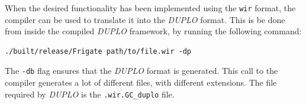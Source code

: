 \documentclass[twoside,11pt,openright]{report}
\newcommand{\DUPLO}{\textit{DUPLO} }
\begin{document}
\bigskip

When the desired functionality has been implemented using the \verb|wir| format, the compiler can be used to translate it into the \DUPLO format. This is be done from inside the compiled \DUPLO framework, by running the following command:

\begin{center}
\begin{verbatim}
./built/release/Frigate path/to/file.wir -dp
\end{verbatim}
\end{center}

The \verb|-db| flag ensures that the \DUPLO format is generated. This call to the compiler generates a lot of different files, with different extensions. The file required by \DUPLO is the \verb|.wir.GC_duplo| file.

\bigskip
\end{document}

